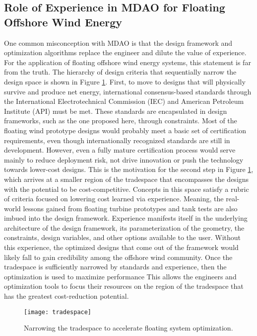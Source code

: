 \subsection{Role of Experience in MDAO for Floating Offshore Wind Energy}
One common misconception with MDAO is that the design framework and
optimization algorithms replace the engineer and dilute the value of
experience.  For the application of floating offshore wind energy
systems, this statement is far from the truth.  The hierarchy of design
criteria that sequentially narrow the design space is shown in Figure
\ref{fig:tradespace}.  First, to move to designs that will physically
survive and produce net energy, international consensus-based standards
through the International Electrotechnical Commission (IEC) and American
Petroleum Institute (API) must be met.  These standards are encapsulated
in design frameworks, such as the one proposed here, through
constraints.  Most of the floating wind prototype designs would probably
meet a basic set of certification requirements, even though
internationally recognized standards are still in development.  However,
even a fully mature certification process would serve mainly to reduce
deployment risk, not drive innovation or push the technology towards
lower-cost designs.  This is the motivation for the second step in
Figure \ref{fig:tradespace}, which arrives at a smaller region of the
tradespace that encompasses the designs with the potential to be
cost-competitive.  Concepts in this space satisfy a rubric of criteria
focused on lowering cost learned via experience.  Meaning, the
real-world lessons gained from floating turbine prototypes and tank
tests are also imbued into the design framework.  Experience manifests
itself in the underlying architecture of the design framework, its
parameterization of the geometry, the constraints, design variables, and
other options available to the user.  Without this experience, the
optimized designs that come out of the framework would likely fall to
gain credibility among the offshore wind community.  Once the tradespace
is sufficiently narrowed by standards and experience, then the
optimization is used to maximize performance This allows the engineers
and optimization tools to focus their resources on the region of the
tradespace that has the greatest cost-reduction potential.

\begin{figure}[htbp]
  \begin{center}
    \texttt{[image: tradespace]}\\
    \caption{Narrowing the tradespace to accelerate floating system optimization.}
    \label{fig:tradespace}
  \end{center}
\end{figure}


